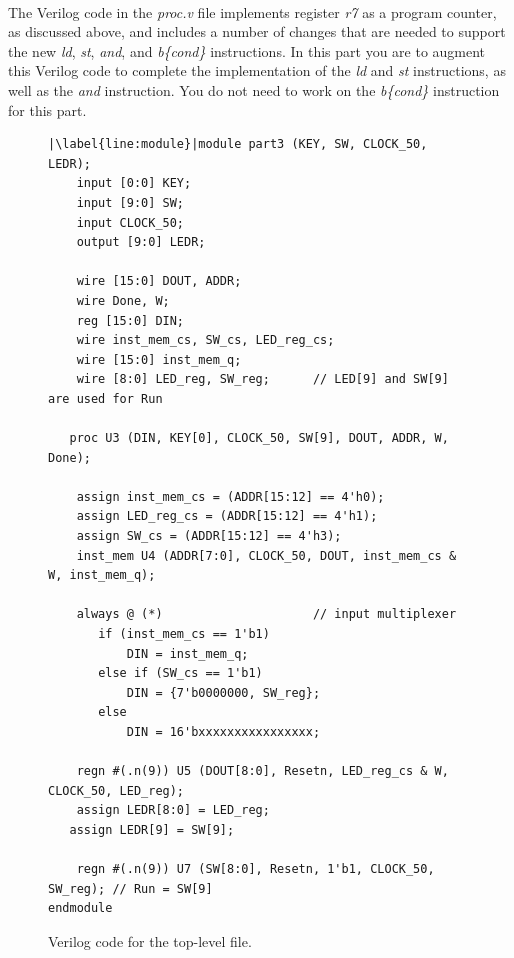 \documentclass[epsfig,10pt,fullpage]{article} \addtolength{\textwidth}{1.5in}
\begin{document}
~\\
\noindent
The Verilog code in the {\it proc.v} file implements register {\it r7} as a program counter,
as discussed above, and includes a number of changes that are needed to support the 
new {\it ld}, {\it st}, {\it and}, and {\it b\{cond\}} instructions. In this part you are to 
augment this Verilog code to complete the implementation of the {\it ld} and
{\it st} instructions, as well as the {\it and} instruction. You do not 
need to work on the {\it b\{cond\}} instruction for this part. 

\lstset{language=Verilog,numbers=none,escapechar=|}
\begin{figure}[h]
\begin{center}
\begin{minipage}[h]{15 cm}
\begin{lstlisting}[name=proc]
|\label{line:module}|module part3 (KEY, SW, CLOCK_50, LEDR);
	input [0:0] KEY;
	input [9:0] SW;
	input CLOCK_50;
	output [9:0] LEDR;	

	wire [15:0] DOUT, ADDR;
	wire Done, W;
	reg [15:0] DIN;
	wire inst_mem_cs, SW_cs, LED_reg_cs;
	wire [15:0] inst_mem_q;
	wire [8:0] LED_reg, SW_reg;      // LED[9] and SW[9] are used for Run

   proc U3 (DIN, KEY[0], CLOCK_50, SW[9], DOUT, ADDR, W, Done);

	assign inst_mem_cs = (ADDR[15:12] == 4'h0);
	assign LED_reg_cs = (ADDR[15:12] == 4'h1);
	assign SW_cs = (ADDR[15:12] == 4'h3);
	inst_mem U4 (ADDR[7:0], CLOCK_50, DOUT, inst_mem_cs & W, inst_mem_q);

	always @ (*)                     // input multiplexer
	   if (inst_mem_cs == 1'b1)
		   DIN = inst_mem_q;
	   else if (SW_cs == 1'b1)
		   DIN = {7'b0000000, SW_reg};
	   else
		   DIN = 16'bxxxxxxxxxxxxxxxx;

	regn #(.n(9)) U5 (DOUT[8:0], Resetn, LED_reg_cs & W, CLOCK_50, LED_reg);
	assign LEDR[8:0] = LED_reg;
   assign LEDR[9] = SW[9];

	regn #(.n(9)) U7 (SW[8:0], Resetn, 1'b1, CLOCK_50, SW_reg); // Run = SW[9]
endmodule
\end{lstlisting}
\end{minipage}
\caption{Verilog code for the top-level file.}
\label{fig:top}
\end{center}
\end{figure}
\end{document}
